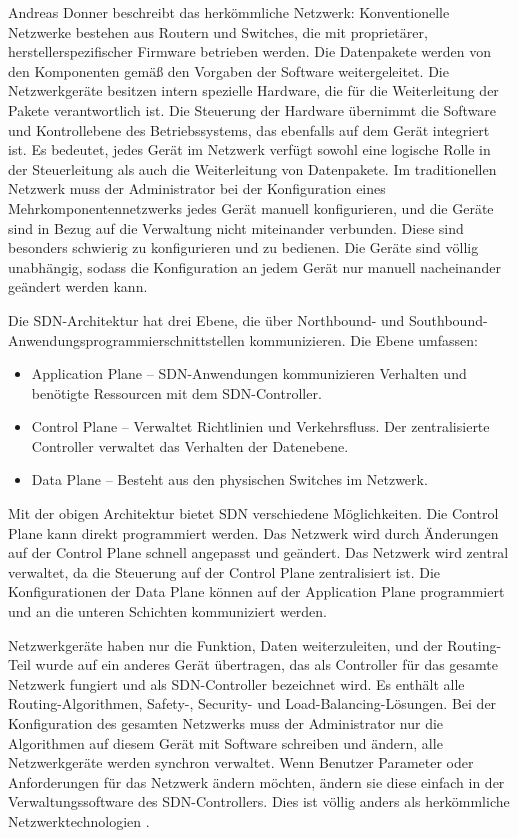 \documentclass[fontsize=12pt,paper=a4,open=any,parskip=half,
  twoside=false,toc=listof,toc=bibliography,fleqn,leqno,
  captions=nooneline,captions=tableabove,british]{scrbook}
\begin{document}
Andreas Donner beschreibt das herkömmliche Netzwerk: 
Konventionelle Netzwerke bestehen aus Routern und Switches, die mit proprietärer, herstellerspezifischer      Firmware betrieben werden. Die Datenpakete werden von den Komponenten gemäß den Vorgaben der Software weitergeleitet. Die Netzwerkgeräte besitzen intern spezielle Hardware, die für die Weiterleitung der Pakete verantwortlich ist. Die Steuerung der Hardware übernimmt die Software und Kontrollebene des Betriebssystems, das ebenfalls auf dem Gerät integriert ist. \cite{tranetworkTung}
Es bedeutet, jedes Gerät im Netzwerk verfügt sowohl eine logische Rolle in der Steuerleitung als auch die Weiterleitung von Datenpakete. Im traditionellen Netzwerk muss der Administrator bei der Konfiguration eines Mehrkomponentennetzwerks jedes Gerät manuell konfigurieren, und die Geräte sind in Bezug auf die Verwaltung nicht miteinander verbunden. Diese sind besonders schwierig zu konfigurieren und zu bedienen. Die Geräte sind völlig unabhängig, sodass die Konfiguration an jedem Gerät nur manuell nacheinander geändert werden kann.

Die SDN-Architektur hat drei Ebene, die über Northbound- und Southbound\hyp{}Anwendungsprogrammierschnittstellen kommunizieren. Die Ebene umfassen:
\begin{itemize}
	\item Application Plane – SDN-Anwendungen kommunizieren Verhalten und benötigte Ressourcen mit dem SDN-Controller.
	\item Control Plane – Verwaltet Richtlinien und Verkehrsfluss. Der zentralisierte Controller verwaltet das Verhalten der Datenebene.
	\item Data Plane – Besteht aus den physischen Switches im Netzwerk.\cite{SDNdefTung}
\end{itemize}



Mit der obigen Architektur bietet SDN verschiedene Möglichkeiten. Die Control Plane kann direkt programmiert werden. Das Netzwerk wird durch Änderungen auf der Control Plane schnell angepasst und geändert. Das Netzwerk wird zentral verwaltet, da die Steuerung auf der Control Plane zentralisiert ist. Die Konfigurationen der Data Plane können auf der Application Plane programmiert und an die unteren Schichten kommuniziert werden.

Netzwerkgeräte haben nur die Funktion, Daten weiterzuleiten, und der Routing-Teil wurde auf ein anderes Gerät übertragen, das als Controller für das gesamte Netzwerk fungiert und als SDN-Controller bezeichnet wird. Es enthält alle Routing-Algorithmen, Safety-, Security- und Load-Balancing-Lösungen. Bei der Konfiguration des gesamten Netzwerks muss der Administrator nur die Algorithmen auf diesem Gerät mit Software schreiben und ändern, alle Netzwerkgeräte werden synchron verwaltet. Wenn Benutzer Parameter oder Anforderungen für das Netzwerk ändern möchten, ändern sie diese einfach in der Verwaltungssoftware des SDN-Controllers. Dies ist völlig anders als herkömmliche Netzwerktechnologien \cite[37-38]{6553676}.
\end{document}
